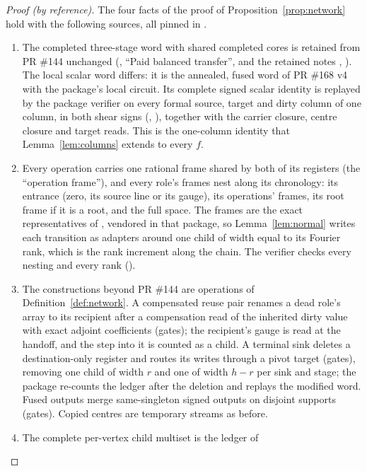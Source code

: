 \documentclass[11pt]{article}
\theoremstyle{definition}
\begin{document}
\begin{proof}[Proof (by reference)]
The four facts of the proof of Proposition~\ref{prop:network} hold with the
following sources, all pinned in \cite{pr200}.
\begin{enumerate}
\item The completed three-stage word with shared completed cores is retained
  from PR \#144 unchanged (, ``Paid balanced transfer'', and the
  retained notes ,
  ). The local scalar word differs: it is
  the annealed, fused word of PR \#168 v4 with the package's local circuit. Its
  complete signed scalar identity is replayed by the package verifier on every
  formal source, target and dirty column of one column, in both shear signs
  (, ), together with
  the carrier closure, centre closure and target reads. This is the
  one-column identity that Lemma~\ref{lem:columns} extends to every $f$.
\item Every operation carries one rational frame shared by both of its
  registers (the ``operation frame''), and every role's frames nest along its
  chronology: its entrance (zero, its source line or its gauge), its
  operations' frames, its root frame if it is a root, and the full space. The
  frames are the exact representatives of
  , vendored in that package, so
  Lemma~\ref{lem:normal} writes each transition as adapters around one child
  of width equal to its Fourier rank, which is the rank increment along the
  chain. The verifier checks every nesting and every rank
  ().
\item The constructions beyond PR \#144 are operations of
  Definition~\ref{def:network}. A compensated reuse pair renames a dead role's
  array to its recipient after a compensation read of the inherited dirty
  value with exact adjoint coefficients (gates); the recipient's gauge is read
  at the handoff, and the step into it is counted as a child. A terminal sink
  deletes a destination-only register and routes its writes through a pivot
  target (gates), removing one child of width $r$ and one of width $h-r$ per
  sink and stage; the package re-counts the ledger after the deletion and
  replays the modified word. Fused outputs merge same-singleton signed outputs
  on disjoint supports (gates). Copied centres are temporary streams as before.
\item The complete per-vertex child multiset is the ledger of

\end{enumerate}
\end{proof}
\end{document}
